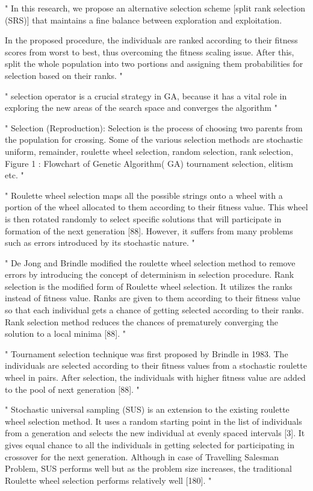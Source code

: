 "
In this research, we propose an alternative selection scheme [split rank selection (SRS)] that maintains a fine balance between exploration and exploitation.

In the proposed procedure, the individuals are ranked according to their fitness scores from worst to best, thus overcoming the fitness scaling issue. After this, split the whole population into two portions and assigning them probabilities for selection based on their ranks.
"\cite{hussain_trade-off_2020}


"
selection operator is a crucial strategy in GA, because it has a vital role in exploring the new areas of the search space and converges the algorithm
"\cite{hussain_trade-off_2020}

"
Selection (Reproduction): Selection is the process of choosing two parents from the population for crossing. Some of the various selection methods are stochastic uniform, remainder, roulette wheel selection, random selection, rank selection, Figure 1 : Flowchart of Genetic Algorithm( GA) tournament selection, elitism etc.
"\cite{majumdar_genetic_2015}



"
Roulette wheel selection maps all the possible strings onto a wheel with a portion of the wheel allocated to them according to their fitness value. This wheel is then rotated randomly to select specific solutions that will participate in formation of the next generation [88]. However, it suffers from many problems such as errors introduced by its stochastic nature.
"\cite{katoch_review_2021}


"
De Jong and Brindle modified the roulette wheel selection method to remove errors by introducing the concept of determinism in selection procedure. Rank selection is the modified form of Roulette wheel selection. It utilizes the ranks instead of fitness value. Ranks are given to them according to their fitness value so that each individual gets a chance of getting selected according to their ranks. Rank selection method reduces the chances of prematurely converging the solution to a local minima [88].
"\cite{katoch_review_2021}


"
Tournament selection technique was first proposed by Brindle in 1983. The individuals are selected according to their fitness values from a stochastic roulette wheel in pairs. After selection, the individuals with higher fitness value are added to the pool of next generation [88].
"\cite{katoch_review_2021}


"
Stochastic universal sampling (SUS) is an extension to the existing roulette wheel selection method. It uses a random starting point in the list of individuals from a generation and selects the new individual at evenly spaced intervals [3]. It gives equal chance to all the individuals in getting selected for participating in crossover for the next generation. Although in case of Travelling Salesman Problem, SUS performs well but as the problem size increases, the traditional Roulette wheel selection performs relatively well [180].
"\cite{katoch_review_2021}

